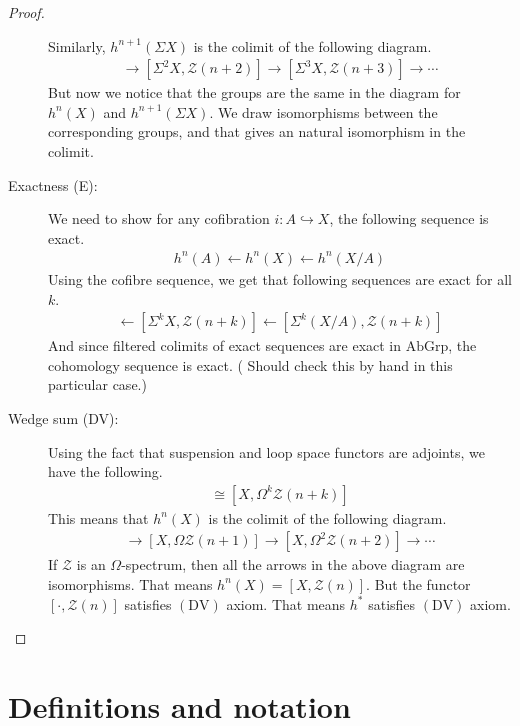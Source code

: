 \documentclass[12pt, notitlepage]{article}
\theoremstyle{definition}
\newcommand{\cat}[1]{\mathrm{#1}}
\newcommand{\calz}{\mathcal{Z}}
\begin{document}
\begin{proof}
\begin{description}
    Similarly, $h^{n+1}(\Sigma X)$ is the colimit of the following diagram.
    \begin{align*}
      [\Sigma X, \calz(n+1)] \to [\Sigma^2 X, \calz(n+2)] \to [\Sigma^3 X, \calz(n+3)] \to \cdots
    \end{align*}
    But now we notice that the groups are the same in the diagram for $h^n(X)$ and
    $h^{n+1}(\Sigma X)$. We draw isomorphisms between the corresponding groups, and that gives an
    natural isomorphism in the colimit.
  \item[Exactness (E):] We need to show for any cofibration $i: A \hookrightarrow X$, the following
    sequence is exact.
    \begin{align*}
      h^n(A) \leftarrow h^n(X) \leftarrow h^n\left( X/A \right)
    \end{align*}
    Using the cofibre sequence, we get that following sequences are exact for all $k$.
    \begin{align*}
      [\Sigma^k A, \calz(n+k)] \leftarrow [\Sigma^k X, \calz(n+k)] \leftarrow \left[\Sigma^k \left(X/A\right), \calz(n+k) \right]
    \end{align*}
    And since filtered colimits of exact sequences are exact in $\cat{AbGrp}$, the cohomology
    sequence is exact. ({\color{red} Should check this by hand in this particular case.})
  \item[Wedge sum (DV):] Using the fact that suspension and loop space functors are adjoints, we
    have the following.
    \begin{align*}
      [\Sigma^k X, \calz(n+k)] \cong [X, \Omega^k \calz(n+k)]
    \end{align*}
    This means that $h^n(X)$ is the colimit of the following diagram.
    \begin{align*}
      [X, \calz(n)] \rightarrow [X, \Omega \calz(n+1)] \rightarrow [X, \Omega^2 \calz(n+2)] \rightarrow \cdots
    \end{align*}
    If $\calz$ is an $\Omega$-spectrum, then all the arrows in the above diagram are
    isomorphisms. That means $h^n(X) = [X, \calz(n)]$. But the functor $[\cdot, \calz(n)]$ satisfies
    $(\mathrm{DV})$ axiom. That means $h^{\ast}$ satisfies $(\mathrm{DV})$ axiom.
  \end{description}
\end{proof}

\newpage

\appendix

\section{Definitions and notation}
\label{sec:definitions-notation}
\end{document}

